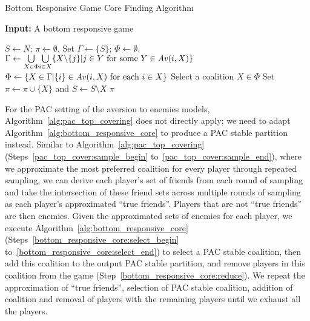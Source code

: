 \begin{algorithm}[htb]
  \caption{Bottom Responsive Game Core Finding Algorithm}
  \label{alg:bottom_responsive_core}
  \textbf{Input:} A bottom responsive game
  \begin{algorithmic}[1]

  \State $S \leftarrow N$; $\pi \leftarrow \emptyset$.
    \State \label{bottom_responsive_core:select_begin} Set
      $\Gamma \leftarrow \{S\}$; $\Phi \leftarrow \emptyset$.
    \While {$\Phi = \emptyset$}
      \State $\Gamma \leftarrow \underset{X \in \Phi}{\bigcup} \underset{i \in X}{\bigcup} \{ X \text{\textbackslash} \{j\} | j \in Y \text{ for some } Y \in \mathit{Av}(i, X)\}$
      \State $\Phi \leftarrow \lbrace X \in \Gamma | \{i\} \in \mathit{Av}(i, X) \text{ for each } i \in X \rbrace$
    \EndWhile
    \State \label{bottom_responsive_core:select_end} Select a coalition
      $X \in \Phi$
    \State \label{bottom_responsive_core:reduce} Set
      $\pi \leftarrow \pi \cup \lbrace X \rbrace$ and
      $S \leftarrow  S \setminus X$
  \EndWhile
  \State \Return $\pi$

  \end{algorithmic}
\end{algorithm}

For the PAC setting of the aversion to enemies models,
Algorithm~\ref{alg:pac_top_covering} does not directly apply; we need to adapt
Algorithm~\ref{alg:bottom_responsive_core} to produce a PAC stable partition
instead.
Similar to Algorithm~\ref{alg:pac_top_covering}
(Steps~\ref{pac_top_cover:sample_begin} to~\ref{pac_top_cover:sample_end}),
where we approximate the most preferred coalition for every player through
repeated sampling, we can derive each player's set of friends from each round
of sampling and take the intersection of these friend sets across multiple rounds
of sampling as each player's approximated ``true friends''.
Players that are not ``true friends'' are then enemies.
Given the approximated sets of enemies for each player, we execute
Algorithm~\ref{alg:bottom_responsive_core}
(Steps~\ref{bottom_responsive_core:select_begin} to~\ref{bottom_responsive_core:select_end}) to select a PAC stable coalition,
then add this coalition to the output PAC stable partition, and remove players
in this coalition from the game (Step~\ref{bottom_responsive_core:reduce}).
We repeat the approximation of ``true friends'', selection of PAC stable
coalition, addition of coalition and removal of players with the remaining
players until we exhaust all the players.


